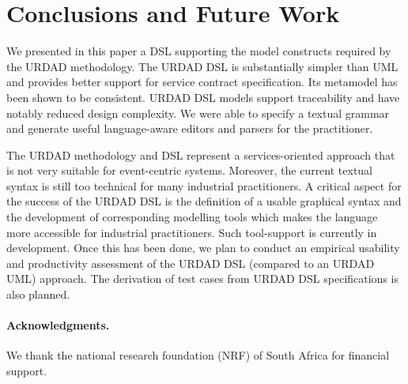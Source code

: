\section{Conclusions and Future Work \label{sec:conclusionsAndOutlook}}

We presented in this paper a DSL supporting the model constructs required by the URDAD methodology. The URDAD DSL is substantially simpler than UML and provides better support for service contract specification. Its metamodel has been shown to be consistent. URDAD DSL models support traceability and have notably reduced design complexity. We were able to specify a textual grammar and generate useful language-aware editors and parsers for the practitioner.

The URDAD methodology and DSL represent a services-oriented approach that is not very suitable for event-centric systems. Moreover, the current textual syntax is still too technical for many industrial practitioners. A critical aspect for the success of the URDAD DSL is the definition of a usable graphical syntax and the development of corresponding modelling tools which makes the language more accessible for industrial practitioners. Such tool-support is currently in development. Once this has been done, we plan to conduct an empirical usability and productivity assessment of the URDAD DSL (compared to an URDAD UML) approach. The derivation of test cases from URDAD DSL specifications is also planned.

\paragraph{Acknowledgments.} We thank the national research 
foundation (NRF) of South Africa for financial support.

